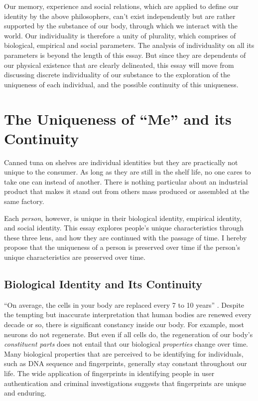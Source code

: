 \documentclass[a4paper,english,12pt]{scrartcl}
\begin{document}
Our memory, experience and social relations, which are applied to
define our identity by the above philosophers, can't exist independently
but are rather supported by the substance of our body, through which we interact
with the world. Our individuality is therefore a unity of plurality,
which comprises of biological, empirical and social parameters. The analysis of individuality
on all its parameters is beyond the length of this essay. But since
they are dependents of our physical existence that are clearly delineated,
this essay will move from discussing discrete individuality of our
substance to the exploration of the uniqueness of each individual,
and the possible continuity of this uniqueness.

\section{The Uniqueness of ``Me'' and its Continuity}

Canned tuna on shelves are individual identities but they are 
practically not unique to the consumer. As long as they are still
in the shelf life, no one cares to take one can instead of another.
There is nothing particular about an industrial product
that makes it stand out from others mass produced or assembled at
the same factory.

Each \emph{person}, however, is unique in their biological identity,
empirical identity, and social identity. This essay explores people's
unique characteristics through these three lens, and how they are
continued with the passage of time. I hereby propose that the uniqueness
of a person is preserved over time if the person's unique characteristics
are preserved over time.

\subsection{Biological Identity and Its Continuity}

``On average, the cells in your body are replaced every 7 to 10 years''
\parencite{what-cells}. Despite the tempting but inaccurate interpretation
that human bodies are renewed every decade or so, there is significant
constancy inside our body. For example, most neurons do not regenerate.
But even if all cells do, the regeneration of our body's \emph{constituent
parts} does not entail that our biological \emph{properties} change
over time. Many biological properties that are perceived to be identifying
for individuals, such as DNA sequence and fingerprints, generally
stay constant throughout our life. The wide application of fingerprints
in identifying people in user authentication and criminal investigations
suggests that fingerprints are unique and enduring.
\end{document}
